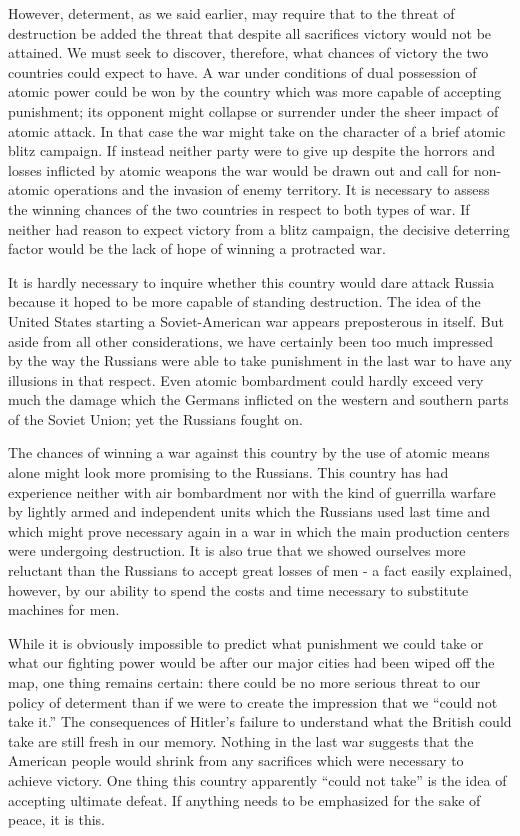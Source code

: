 However, determent, as we said earlier, may require that to the threat of destruction be added the threat that despite all sacrifices victory would not be attained. We must seek to discover, therefore, what chances of victory the two countries could expect to have. A war under conditions of dual possession of atomic power could be won by the country which was more capable of accepting punishment; its opponent might collapse or surrender under the sheer impact of atomic attack. In that case the war might take on the character of a brief atomic blitz campaign. If instead neither party were to give up despite the horrors and losses inflicted by atomic weapons the war would be drawn out and call for non-atomic operations and the invasion of enemy territory. It is necessary to assess the winning chances of the two countries in respect to both types of war. If neither had reason to expect victory from a blitz campaign, the decisive deterring factor would be the lack of hope of winning a protracted war.

It is hardly necessary to inquire whether this country would dare attack Russia because it hoped to be more capable of standing destruction. The idea of the United States starting a Soviet-American war appears preposterous in itself. But aside from all other considerations, we have certainly been too much impressed by the way the Russians were able to take punishment in the last war to have any illusions in that respect. Even atomic bombardment could hardly exceed very much the damage which the Germans inflicted on the western and southern parts of the Soviet Union; yet the Russians fought on.

The chances of winning a war against this country by the use of atomic means alone might look more promising to the Russians. This country has had experience neither with air bombardment nor with the kind of guerrilla warfare by lightly armed and independent units which the Russians used last time and which might prove necessary again in a war in which the main production centers were undergoing destruction. It is also true that we showed ourselves more reluctant than the Russians to accept great losses of men - a fact easily explained, however, by our ability to spend the costs and time necessary to substitute machines for men.

While it is obviously impossible to predict what punishment we could take or what our fighting power would be after our major cities had been wiped off the map, one thing remains certain: there could be no more serious threat to our policy of determent than if we were to create the impression that we ``could not take it.'' The consequences of Hitler's failure to understand what the British could take are still fresh in our memory. Nothing in the last war suggests that the American people would shrink from any sacrifices which were necessary to achieve victory. One thing this country apparently ``could not take'' is the idea of accepting ultimate defeat. If anything needs to be emphasized for the sake of peace, it is this.

